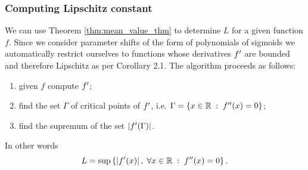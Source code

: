 \documentclass[../main.tex]{subfiles}
\begin{document}
\subsubsection{Computing Lipschitz constant}\label{subsubsec:lipschitz_const}

We can use Theorem \ref{thm:mean_value_thm} to determine $L$ for a given function $f$.
Since we consider parameter shifts of the form of polynomials of sigmoids we automatically restrict ourselves to functions whose derivatives $f'$ are bounded and therefore Lipschitz as per Corollary 2.1.
The algorithm proceeds as follows:
\begin{enumerate}
     \item given $f$ compute $f'$;
     \item find the set $\Gamma$ of critical points of $f'$, i.e. $\Gamma = \{x\in \mathbb{R}\;:\;f''(x)=0\}$;
     \item find the supremum of the set $|f'(\Gamma)|$.
\end{enumerate}
In other words
\begin{equation}\label{eq:lipschitz_constant}
        L = \sup\,\{|f'(x)|\,,\;\forall x \in \mathbb{R}\;:\;f''(x)=0\}\,.
\end{equation}
\end{document}
